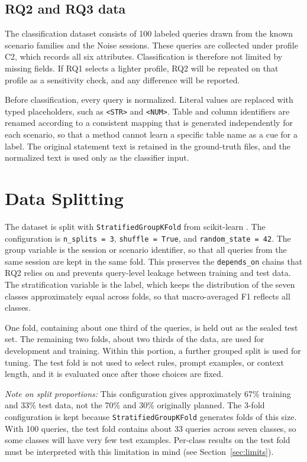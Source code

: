 \documentclass[12pt,a4paper]{report}
\begin{document}
\subsection{RQ2 and RQ3 data}
The classification dataset consists of 100 labeled queries drawn from the known scenario families and the Noise sessions. These queries are collected under profile C2, which records all six attributes. Classification is therefore not limited by missing fields. If RQ1 selects a lighter profile, RQ2 will be repeated on that profile as a sensitivity check, and any difference will be reported.

Before classification, every query is normalized. Literal values are replaced with typed placeholders, such as \texttt{<STR>} and \texttt{<NUM>}. Table and column identifiers are renamed according to a consistent mapping that is generated independently for each scenario, so that a method cannot learn a specific table name as a cue for a label. The original statement text is retained in the ground-truth files, and the normalized text is used only as the classifier input.

\section{Data Splitting}
\label{sec:split}
The dataset is split with \texttt{StratifiedGroupKFold} from scikit-learn \cite{scikit-learn_stratifiedgroupkfold}. The configuration is \texttt{n\_splits = 3}, \texttt{shuffle = True}, and \texttt{random\_state = 42}. The group variable is the session or scenario identifier, so that all queries from the same session are kept in the same fold. This preserves the \texttt{depends\_on} chains that RQ2 relies on and prevents query-level leakage between training and test data. The stratification variable is the label, which keeps the distribution of the seven classes approximately equal across folds, so that macro-averaged F1 reflects all classes.

One fold, containing about one third of the queries, is held out as the sealed test set. The remaining two folds, about two thirds of the data, are used for development and training. Within this portion, a further grouped split is used for tuning. The test fold is not used to select rules, prompt examples, or context length, and it is evaluated once after those choices are fixed.

\textit{Note on split proportions:} This configuration gives approximately 67\% training and 33\% test data, not the 70\% and 30\% originally planned. The 3-fold configuration is kept because \texttt{StratifiedGroupKFold} generates folds of this size. With 100 queries, the test fold contains about 33 queries across seven classes, so some classes will have very few test examples. Per-class results on the test fold must be interpreted with this limitation in mind (see Section~\ref{sec:limits}).
\end{document}
